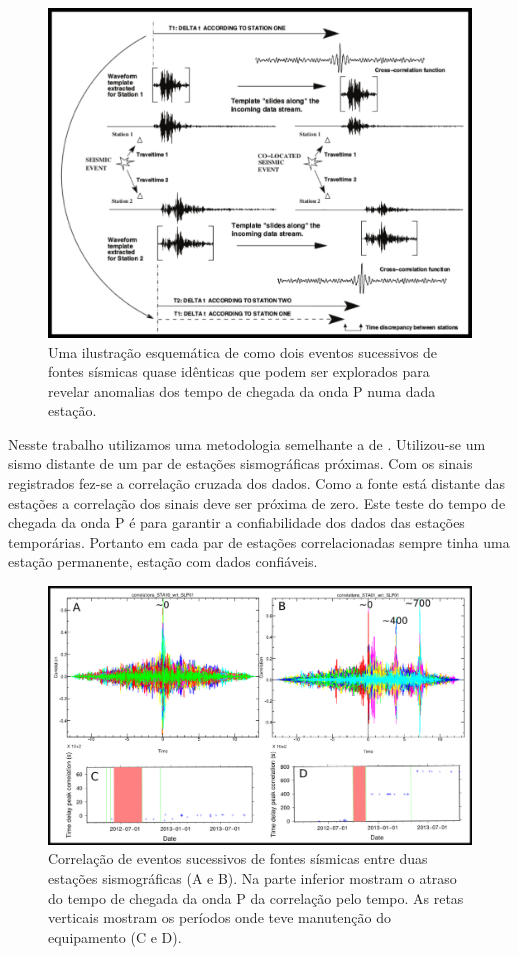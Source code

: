 \begin{figure}[!ht]
\centering
\includegraphics[scale=0.7]{correlacao_tempo_de_chegada.png}
\caption{Uma ilustração esquemática de como dois eventos sucessivos de fontes sísmicas quase idênticas que podem ser explorados para revelar anomalias dos tempo de chegada da onda P numa dada estação. \citep{gibbons_identification_2006}}
\label{teste_tempo}
\end{figure}

Nesste trabalho utilizamos uma metodologia semelhante a de \cite{gibbons_identification_2006}. Utilizou-se um sismo distante de um par de estações sismográficas próximas. Com os sinais registrados fez-se a correlação cruzada dos dados. Como a fonte está distante das estações a correlação dos sinais deve ser próxima de zero. Este teste do tempo de chegada da onda P é para garantir a confiabilidade dos dados das estações temporárias. Portanto em cada par de estações correlacionadas sempre tinha uma estação permanente, estação com dados confiáveis.

\begin{figure}[!ht]
\centering
\includegraphics[scale=0.4]{correlacao_tempo_de_chegada_resultado.png}
\caption{Correlação de eventos sucessivos de fontes sísmicas entre duas estações sismográficas (A e B). Na parte inferior mostram o atraso do tempo de chegada da onda P da correlação pelo tempo. As retas verticais mostram os períodos onde teve manutenção do equipamento (C e D).}
\label{teste_tempo_results}
\end{figure}

